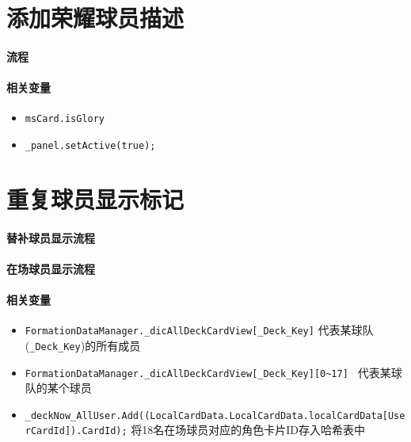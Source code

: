 \documentclass[UTF8,a4paper,12pt]{ctexbook}
\begin{document}
	 
	\section{添加荣耀球员描述}
		\paragraph{流程}
			
		\paragraph{相关变量}
			\begin{itemize}
				\item \verb|msCard.isGlory|
				\item \verb|_panel.setActive(true);|
			\end{itemize}
			
			
	\section{重复球员显示标记}
		\paragraph{替补球员显示流程}
		
		\paragraph{在场球员显示流程}
	   
	   \paragraph{相关变量}
	   		\begin{itemize}
	   			\item \verb|FormationDataManager._dicAllDeckCardView[_Deck_Key]| 代表某球队(\verb|_Deck_Key|)的所有成员
	   			\item \verb|FormationDataManager._dicAllDeckCardView[_Deck_Key][0~17] | 代表某球队的某个球员
	   			\item \verb|_deckNow_AllUser.Add((LocalCardData.LocalCardData.localCardData[UserCardId]).CardId);| 将18名在场球员对应的角色卡片ID存入哈希表中
	   		\end{itemize}
   		
\end{document}
